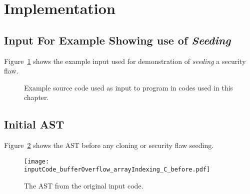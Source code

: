 \section{Implementation}

\subsection{Input For Example Showing use of {\em Seeding}}

   Figure~\ref{Tutorial:exampleInputCode_bufferOverflow}
shows the example input used for demonstration of {\em seeding} 
a security flaw.

\begin{figure}[h!]
{\indent
{\mySmallFontSize

\begin{latexonly}
   
\end{latexonly}

\begin{htmlonly}
   
\end{htmlonly}

}
}
\caption{Example source code used as input to program in codes used in this chapter.}
\label{Tutorial:exampleInputCode_bufferOverflow}
\end{figure}


% 
% 
% 

\subsection{Initial AST}

Figure~\ref{arrayIndexing_C_before} shows the AST before any cloning or security flaw
seeding.

\begin{figure}[h!]
\hspace{-0.35in}
\texttt{[image: inputCode\_bufferOverflow\_arrayIndexing\_C\_before.pdf]}
\caption{The AST from the original input code.}
\label {arrayIndexing_C_before}
\end{figure}

